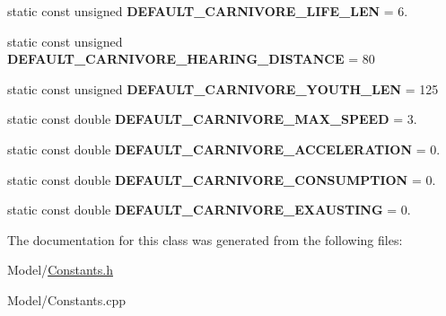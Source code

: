 \begin{DoxyCompactItemize}
\item 
\hypertarget{class_constants_ab038ed8880f9f38ce69853a08ad32674}{}static const unsigned {\bfseries D\+E\+F\+A\+U\+L\+T\+\_\+\+C\+A\+R\+N\+I\+V\+O\+R\+E\+\_\+\+L\+I\+F\+E\+\_\+\+L\+E\+N} = 6.\label{class_constants_ab038ed8880f9f38ce69853a08ad32674}

\item 
\hypertarget{class_constants_a7eb6ac7ce35a576ed1ad2064920c9733}{}static const unsigned {\bfseries D\+E\+F\+A\+U\+L\+T\+\_\+\+C\+A\+R\+N\+I\+V\+O\+R\+E\+\_\+\+H\+E\+A\+R\+I\+N\+G\+\_\+\+D\+I\+S\+T\+A\+N\+C\+E} = 80\label{class_constants_a7eb6ac7ce35a576ed1ad2064920c9733}

\item 
\hypertarget{class_constants_aede16ec3483d9fcb0461147f58a2186a}{}static const unsigned {\bfseries D\+E\+F\+A\+U\+L\+T\+\_\+\+C\+A\+R\+N\+I\+V\+O\+R\+E\+\_\+\+Y\+O\+U\+T\+H\+\_\+\+L\+E\+N} = 125\label{class_constants_aede16ec3483d9fcb0461147f58a2186a}

\item 
\hypertarget{class_constants_a11df90f6e963fe179fa9900aaa4118bc}{}static const double {\bfseries D\+E\+F\+A\+U\+L\+T\+\_\+\+C\+A\+R\+N\+I\+V\+O\+R\+E\+\_\+\+M\+A\+X\+\_\+\+S\+P\+E\+E\+D} = 3.\label{class_constants_a11df90f6e963fe179fa9900aaa4118bc}

\item 
\hypertarget{class_constants_afbaf2966b068fa3f82bb16d6a255e6cb}{}static const double {\bfseries D\+E\+F\+A\+U\+L\+T\+\_\+\+C\+A\+R\+N\+I\+V\+O\+R\+E\+\_\+\+A\+C\+C\+E\+L\+E\+R\+A\+T\+I\+O\+N} = 0.\label{class_constants_afbaf2966b068fa3f82bb16d6a255e6cb}

\item 
\hypertarget{class_constants_a2bb537933dfd417d2a1bc0bc72b4fe3e}{}static const double {\bfseries D\+E\+F\+A\+U\+L\+T\+\_\+\+C\+A\+R\+N\+I\+V\+O\+R\+E\+\_\+\+C\+O\+N\+S\+U\+M\+P\+T\+I\+O\+N} = 0.\label{class_constants_a2bb537933dfd417d2a1bc0bc72b4fe3e}

\item 
\hypertarget{class_constants_a0f960f74c431db529b2802de1d849368}{}static const double {\bfseries D\+E\+F\+A\+U\+L\+T\+\_\+\+C\+A\+R\+N\+I\+V\+O\+R\+E\+\_\+\+E\+X\+A\+U\+S\+T\+I\+N\+G} = 0.\label{class_constants_a0f960f74c431db529b2802de1d849368}

\end{DoxyCompactItemize}


The documentation for this class was generated from the following files\+:\begin{DoxyCompactItemize}
\item 
Model/\hyperlink{_constants_8h}{Constants.\+h}\item 
Model/Constants.\+cpp\end{DoxyCompactItemize}
